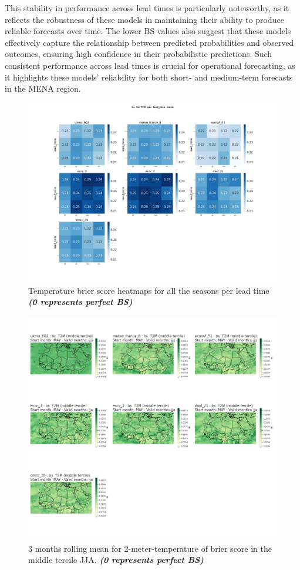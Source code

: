 This stability in performance across lead times is particularly noteworthy, as it reflects the robustness of these models in maintaining their ability to produce reliable forecasts over time. The lower BS values also suggest that these models effectively capture the relationship between predicted probabilities and observed outcomes, ensuring high confidence in their probabilistic predictions. Such consistent performance across lead times is crucial for operational forecasting, as it highlights these models' reliability for both short- and medium-term forecasts in the MENA region.

\begin{figure}[H]
    \centering
    \includegraphics[width=1\linewidth]{plots/prob/bs/bs_T2M_lead_time_mena.png}
    \caption{Temperature brier score heatmaps for all the seasons per lead time \textbf{\textit{(0 represents perfect BS)} }}
\end{figure}


\begin{figure}[H]
    \centering
    \includegraphics[width=1\linewidth]{plots/prob/bs/bs_jja_t2m_middle.png}
    \caption{3 months rolling mean for 2-meter-temperature of brier score in the middle tercile JJA. \textbf{\textit{(0 represents perfect BS)} }}
\end{figure}

